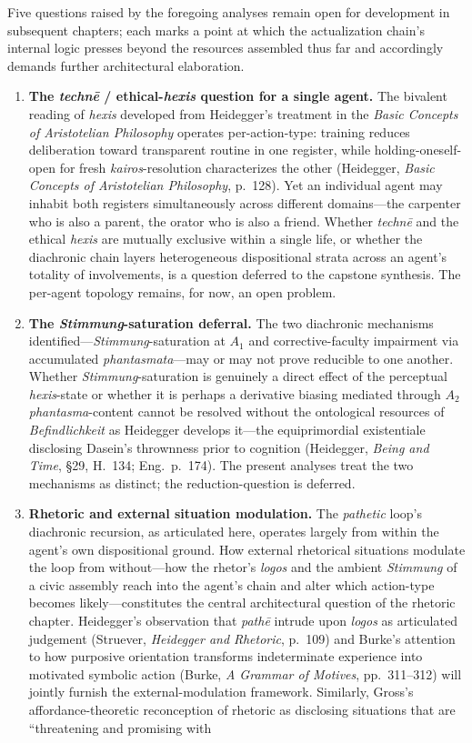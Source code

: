 Five questions raised by the foregoing analyses remain open for development in subsequent chapters; each marks a point at which the actualization chain's internal logic presses beyond the resources assembled thus far and accordingly demands further architectural elaboration. \begin{enumerate}

\item \textbf{The \textit{technē} / ethical-\textit{hexis} question for a single agent.} The bivalent reading of \textit{hexis} developed from Heidegger's treatment in the \textit{Basic Concepts of Aristotelian Philosophy} operates per-action-type: training reduces deliberation toward transparent routine in one register, while holding-oneself-open for fresh \textit{kairos}-resolution characterizes the other (Heidegger, \textit{Basic Concepts of Aristotelian Philosophy}, p.~128). Yet an individual agent may inhabit both registers simultaneously across different domains---the carpenter who is also a parent, the orator who is also a friend. Whether \textit{technē} and the ethical \textit{hexis} are mutually exclusive within a single life, or whether the diachronic chain layers heterogeneous dispositional strata across an agent's totality of involvements, is a question deferred to the capstone synthesis. The per-agent topology remains, for now, an open problem. \item \textbf{The \textit{Stimmung}-saturation deferral.} The two diachronic mechanisms identified---\textit{Stimmung}-saturation at $A_1$ and corrective-faculty impairment via accumulated \textit{phantasmata}---may or may not prove reducible to one another. Whether \textit{Stimmung}-saturation is genuinely a direct effect of the perceptual \textit{hexis}-state or whether it is perhaps a derivative biasing mediated through $A_2$ \textit{phantasma}-content cannot be resolved without the ontological resources of \textit{Befindlichkeit} as Heidegger develops it---the equiprimordial existentiale disclosing Dasein's thrownness prior to cognition (Heidegger, \textit{Being and Time}, \S29, H.~134; Eng.~p.~174). The present analyses treat the two mechanisms as distinct; the reduction-question is deferred. \item \textbf{Rhetoric and external situation modulation.} The \textit{pathetic} loop's diachronic recursion, as articulated here, operates largely from within the agent's own dispositional ground. How external rhetorical situations modulate the loop from without---how the rhetor's \textit{logos} and the ambient \textit{Stimmung} of a civic assembly reach into the agent's chain and alter which action-type becomes likely---constitutes the central architectural question of the rhetoric chapter. Heidegger's observation that \textit{pathē} intrude upon \textit{logos} as articulated judgement (Struever, \textit{Heidegger and Rhetoric}, p.~109) and Burke's attention to how purposive orientation transforms indeterminate experience into motivated symbolic action (Burke, \textit{A Grammar of Motives}, pp.~311--312) will jointly furnish the external-modulation framework. Similarly, Gross's affordance-theoretic reconception of rhetoric as disclosing situations that are ``threatening and promising with 
\end{enumerate}

